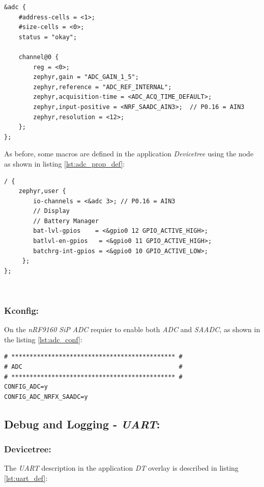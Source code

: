 \documentclass[report.tex]{subfiles}
\begin{document}
\begin{lstlisting}[style=C,label={lst:adc_def},caption={\textit{DT} \textit{ADC} Description}]
&adc {
	#address-cells = <1>;
	#size-cells = <0>;
    status = "okay";

	channel@0 {
		reg = <0>;
		zephyr,gain = "ADC_GAIN_1_5";
		zephyr,reference = "ADC_REF_INTERNAL";
		zephyr,acquisition-time = <ADC_ACQ_TIME_DEFAULT>;
		zephyr,input-positive = <NRF_SAADC_AIN3>;  // P0.16 = AIN3
		zephyr,resolution = <12>;
	};
};

\end{lstlisting}

As before, some macros are defined in the application \textit{Devicetree} using the  node as shown in listing \ref{lst:adc_prop_def}:

\begin{lstlisting}[style=C,label={lst:adc_prop_def},caption={\textit{DT} \textit{ADC} Proprieties Description}]
/ {
	zephyr,user {
		io-channels = <&adc 3>; // P0.16 = AIN3
		// Display
		// Battery Manager
		bat-lvl-gpios	 = <&gpio0 12 GPIO_ACTIVE_HIGH>;
		batlvl-en-gpios   = <&gpio0 11 GPIO_ACTIVE_HIGH>;
		batchrg-int-gpios = <&gpio0 10 GPIO_ACTIVE_LOW>;
	 };
};
\end{lstlisting}
\;\\[-50pt]
\subsubsection{Kconfig:}
On the \textit{nRF9160 SiP} \textit{ADC} requier to enable both \textit{ADC} and \textit{SAADC}, as shown in the listing \ref{lst:adc_conf}:
\begin{lstlisting}[style=console,label={lst:adc_conf},caption={Application \textit{ADC} Configuration}]
# ********************************************* #
# ADC                                           #
# ********************************************* #
CONFIG_ADC=y
CONFIG_ADC_NRFX_SAADC=y
\end{lstlisting}

\subsection{Debug and Logging - \textit{UART}:}
\subsubsection{Devicetree:}
The \textit{UART} description in the application \textit{DT} overlay is described in listing  \ref{lst:uart_def}:
\end{document}

